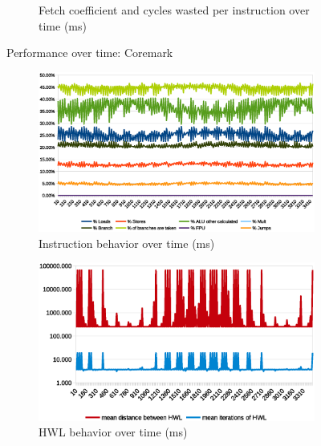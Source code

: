 \documentclass[../bachelor_paper.tex]{subfiles}
\begin{document}
\begin{figure}
\begin{subfigure}{0.45\textwidth}
        \caption{Fetch coefficient and cycles wasted per instruction over time (ms)}
        \label{fig:res/coremark/fetch_waste}
    \end{subfigure}
    \caption{Performance over time: Coremark}
    \label{fig:res/coremark}
\end{figure}

\begin{figure}
    \begin{subfigure}{0.45\textwidth}
        \includegraphics[width=\textwidth]{img/graph/embench/sglib-combined_inst.eps}
        \caption{Instruction behavior over time (ms)}
        \label{fig:res/sglib/inst}
    \end{subfigure}
    \begin{subfigure}{0.45\textwidth}
        \includegraphics[width=\textwidth]{img/graph/embench/sglib-combined_hwl.eps}
        \caption{\ac{HWL} behavior over time (ms)}
        \label{fig:res/sglib/hwl}
    \end{subfigure}
    \begin{subfigure}{0.45\textwidth}

\end{subfigure}
\end{figure}
\end{document}
